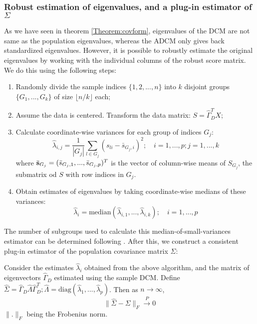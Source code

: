 \documentclass[fleqn,11pt]{article}
\begin{document}
\subsubsection{Robust estimation of eigenvalues, and a plug-in estimator of $\Sigma$}

As we have seen in theorem \ref{Theorem:covform}, eigenvalues of the DCM are not same as the population eigenvalues, whereas the ADCM only gives back standardized eigenvalues. However, it is possible to robustly estimate the original eigenvalues by working with the individual columns of the robust score matrix. We do this using the following steps:

\begin{enumerate}
\item Randomly divide the sample indices $\{1,2,...,n\}$ into $k$ disjoint groups $\{G_1,...,G_k \}$ of size $\lfloor n/k \rfloor$ each;

\item Assume the data is centered. Transform the data matrix: $S = \hat\Gamma^T_D X$;

\item Calculate coordinate-wise variances for each group of indices $G_j$:
%
$$
\hat\lambda_{i,j} = \frac{1}{|G_j|} \sum_{l \in G_j} (s_{li} - \bar s_{G_j,i})^2; \quad i = 1,...,p; j = 1,...,k
$$
where $\bar{{\bf{s}}}_{G_j} = (\bar s_{G_j,1}, ..., \bar s_{G_j,p})^T$ is the vector of column-wise means of $S_{G_j}$, the submatrix od $S$ with row indices in $G_j$.
%
\item Obtain estimates of eigenvalues by taking coordinate-wise medians of these variances:
%
$$
\hat \lambda_i = \text{median} (\hat\lambda_{i,1}, ... , \hat\lambda_{i,k} ); \quad i = 1,...,p
$$
%
\end{enumerate}
%
The number of subgroups used to calculate this median-of-small-variances estimator can be determined following \citep{Minsker15}. After this, we construct a consistent plug-in estimator of the population covariance matrix $\Sigma$:

\begin{Theorem}\label{Thm:pluginSigma}
Consider the estimates $\hat\lambda_i$ obtained from the above algorithm, and the matrix of eigenvectors $\hat\Gamma_D$ estimated using the sample DCM. Define $\hat\Sigma = \hat\Gamma_D \hat\Lambda \hat\Gamma_D^T; \hat\Lambda = \text{diag}(\hat\lambda_1, ..., \hat\lambda_p)$. Then as $n \rightarrow \infty$,
%
$$ \| \hat\Sigma - \Sigma \|_F \stackrel{P}{\rightarrow} 0 $$
%
$\|.\|_F$ being the Frobenius norm.
\end{Theorem}
\end{document}
